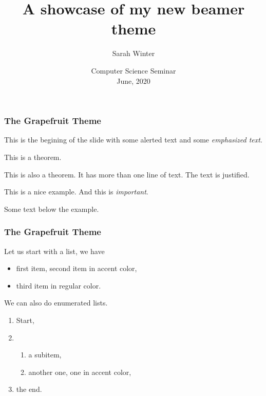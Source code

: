 \documentclass[aspectratio=43,usenames,dvipsnames,t]{beamer}
\title[A showcase of my new beamer theme] %
{A showcase of my new beamer theme}
\author[Sarah Winter] %
{Sarah Winter}
\institute[ULB] %
{
  Université libre de Bruxelles (ULB), Brussels, Belgium
}
\date[Seminar, June, 2020] %
{
  Computer Science Seminar\\
  June, 2020
}
\begin{document}

\begin{frame}[plain]
 \titlepage
\end{frame}



\begin{frame}[label=firstframe]
\frametitle{The \textbf{Grapefruit} Theme}

This is the begining of the slide with some \alert{alerted text} and some \emph{emphasized text}.

\begin{theorem}
  This is a theorem.
\end{theorem}

\begin{theorem}[W.'20]
  This is also a theorem. It has more than one line of text. The text is justified.
\end{theorem}

\begin{example}
  This is a nice example.
  And this is \emph{important}.
\end{example}

Some text below the example.

\end{frame}

\begin{frame}[label=secondframe]
\frametitle{The \textbf{Grapefruit} Theme}

Let us start with a list, we have
\begin{itemize}
  \item first item,
  \itemaccent second item in accent color,
  \item third item in regular color.
\end{itemize}

\bigskip

We can also do enumerated lists.
\begin{enumerate}
  \item Start,
  \item \begin{enumerate}
    \item a subitem,
    \item another one,
    \enumaccent one in accent color,
  \end{enumerate}
  \item the end.
\end{enumerate}

\end{frame}
\end{document}
